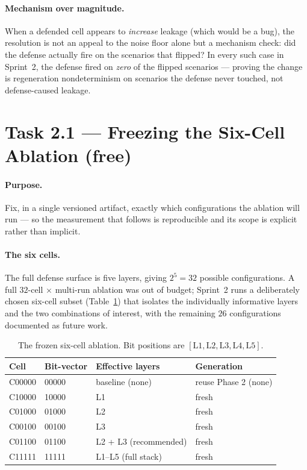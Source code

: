 \documentclass[11pt,a4paper]{article}
\begin{document}
\paragraph{Mechanism over magnitude.} When a defended cell appears to \emph{increase} leakage (which would be a bug), the resolution is not an appeal to the noise floor alone but a mechanism check: did the defense actually fire on the scenarios that flipped? In every such case in Sprint~2, the defense fired on \emph{zero} of the flipped scenarios --- proving the change is regeneration nondeterminism on scenarios the defense never touched, not defense-caused leakage.

\section{Task 2.1 --- Freezing the Six-Cell Ablation (free)}

\paragraph{Purpose.} Fix, in a single versioned artifact, exactly which configurations the ablation will run --- so the measurement that follows is reproducible and its scope is explicit rather than implicit.

\paragraph{The six cells.} The full defense surface is five layers, giving $2^5 = 32$ possible configurations. A full $32$-cell $\times$ multi-run ablation was out of budget; Sprint~2 runs a deliberately chosen six-cell subset (Table~\ref{tab:configs}) that isolates the individually informative layers and the two combinations of interest, with the remaining $26$ configurations documented as future work.

\begin{table}[h]
\centering
\caption{The frozen six-cell ablation. Bit positions are $[\text{L1},\text{L2},\text{L3},\text{L4},\text{L5}]$.}
\label{tab:configs}
\begin{tabular}{l l l l}
\toprule
\textbf{Cell} & \textbf{Bit-vector} & \textbf{Effective layers} & \textbf{Generation} \\
\midrule
C00000 & 00000 & baseline (none) & reuse Phase 2 (none) \\
C10000 & 10000 & L1 & fresh \\
C01000 & 01000 & L2 & fresh \\
C00100 & 00100 & L3 & fresh \\
C01100 & 01100 & L2 + L3 (recommended) & fresh \\
C11111 & 11111 & L1--L5 (full stack) & fresh \\
\bottomrule
\end{tabular}
\end{table}
\end{document}
